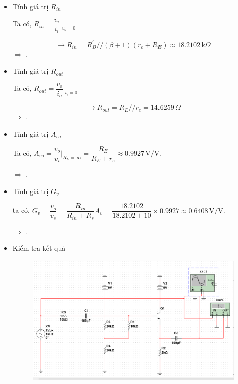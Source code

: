 \begin{itemize}[label=-]
	\item Tính giá trị $R_{in}$
	
	Ta có, $R_{in} = \dfrac{v_{i}}{i_{i}}|_{v_{o} = 0}$

	\[ \rightarrow R_{in} = R_{B}^{'} // (\beta + 1)(r_{e} + R_{E}) \approx 18.2102\,\text{k}\Omega \]
	$\Rightarrow$ .
	
	\item Tính giá trị $R_{out}$
	
	Ta có, $R_{out} = \dfrac{v_{o}}{i_{o}}|_{i_{i} = 0}$ 
	
	\[\rightarrow R_{out} = R_{E} // r_{e} = 14.6259\,\Omega \]
	$\Rightarrow$ .
	
	\item Tính giá trị $A_{vo}$
	
	Ta có, $A_{vo} = \dfrac{v_{o}}{v_{i}}|_{R_{L} = \infty} = \dfrac{R_{E}}{R_{E} + r_{e}} \approx 0.9927\,\text{V/V}$.
	
	$\Rightarrow$ .
	
	\item Tính giá trị $G_{v}$
	
	ta có, $G_{v} = \dfrac{v_{o}}{v_{s}} = \dfrac{R_{in}}{R_{in} + R_{s}} A_{v} = \dfrac{18.2102}{18.2102 + 10}\times 0.9927 \approx 0.6408 \,\text{V/V}$.
	
	$\Rightarrow$ . 
	
	\item Kiểm tra kết quả
	
	\begin{figure}[H]
		\centering
		\includegraphics[width=.8\linewidth]{./my-chapters/my-images/Question4/cauc_test.png}
	\end{figure}
	

\end{itemize}
